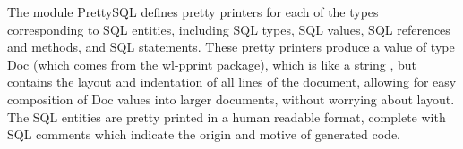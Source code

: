     
    
    The module PrettySQL defines pretty printers for each of 
    the types
    corresponding to SQL entities, including SQL types, SQL 
    values, SQL references
    and methods, and SQL statements. These pretty printers 
    produce a value of
    type Doc (which comes from the wl-pprint package), which is 
    like a string
    , but contains the layout and indentation of all lines of 
    the document,
    allowing for easy composition of Doc values into larger 
    documents, without
    worrying about layout. The SQL entities are pretty printed 
    in a human
    readable format, complete with SQL comments which indicate 
    the origin
    and motive of generated code. 
    
    
    
